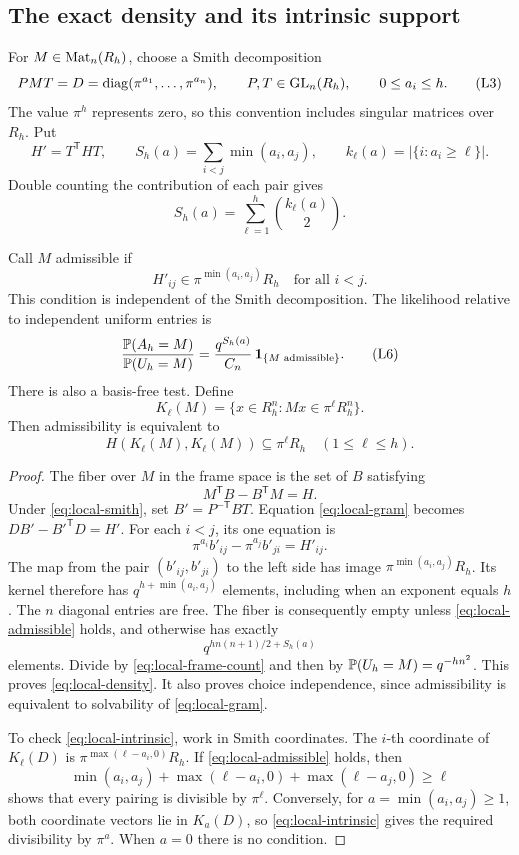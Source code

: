 \subsection{The exact density and its intrinsic support}

For \(M\in\operatorname{Mat}_n(R_h)\), choose a Smith decomposition
\[
 PMT=D=\operatorname{diag}(\pi^{a_1},\ldots,\pi^{a_n}),\qquad
 P,T\in\operatorname{GL}_n(R_h),\qquad 0\le a_i\le h.
 \tag{L3}\label{eq:local-smith}
\]
The value \(\pi^h\) represents zero, so this convention includes singular
matrices over \(R_h\). Put
\[
 H'=T^{\mathsf T}HT,\qquad
 S_h(a)=\sum_{i<j}\min(a_i,a_j),\qquad
 k_\ell(a)=|\{i:a_i\ge\ell\}|.
\]
Double counting the contribution of each pair gives
\[
 S_h(a)=\sum_{\ell=1}^h\binom{k_\ell(a)}2.
 \tag{L4}\label{eq:local-cost}
\]

\begin{theorem}\label{thm:local-density}
Call \(M\) admissible if
\[
 H'_{ij}\in\pi^{\min(a_i,a_j)}R_h\quad\text{for all }i<j.
 \tag{L5}\label{eq:local-admissible}
\]
This condition is independent of the Smith decomposition.
The likelihood relative to independent uniform entries is
\[
 \frac{\mathbb P(A_h=M)}{\mathbb P(U_h=M)}
   =\frac{q^{S_h(a)}}{C_n}\,\mathbf 1_{\{M\text{ admissible}\}}.
 \tag{L6}\label{eq:local-density}
\]
There is also a basis-free test. Define
\[
 K_\ell(M)=\{x\in R_h^n:Mx\in\pi^\ell R_h^n\}.
\]
Then admissibility is equivalent to
\[
 H(K_\ell(M),K_\ell(M))\subseteq\pi^\ell R_h
          \quad(1\le\ell\le h).
 \tag{L7}\label{eq:local-intrinsic}
\]
\end{theorem}

\begin{proof}
The fiber over \(M\) in the frame space is the set of \(B\) satisfying
\[
 M^{\mathsf T}B-B^{\mathsf T}M=H.
 \tag{L8}\label{eq:local-gram}
\]
Under \eqref{eq:local-smith}, set \(B'=P^{-\mathsf T}BT\).
Equation \eqref{eq:local-gram} becomes
\(DB'-B'^{\mathsf T}D=H'\).
For each \(i<j\), its one equation is
\[
 \pi^{a_i}b'_{ij}-\pi^{a_j}b'_{ji}=H'_{ij}.
\]
The map from the pair \((b'_{ij},b'_{ji})\) to the left side has image
\(\pi^{\min(a_i,a_j)}R_h\). Its kernel therefore has
\(q^{h+\min(a_i,a_j)}\) elements, including when an exponent equals \(h\).
The \(n\) diagonal entries are free. The fiber is consequently empty
unless \eqref{eq:local-admissible} holds, and otherwise has exactly
\[
 q^{h n(n+1)/2+S_h(a)}
\]
elements. Divide by \eqref{eq:local-frame-count} and then by
\(\mathbb P(U_h=M)=q^{-hn^2}\). This proves \eqref{eq:local-density}.
It also proves choice independence, since admissibility is equivalent
to solvability of \eqref{eq:local-gram}.

To check \eqref{eq:local-intrinsic}, work in Smith coordinates.
The \(i\)-th coordinate of \(K_\ell(D)\) is
\(\pi^{\max(\ell-a_i,0)}R_h\).
If \eqref{eq:local-admissible} holds, then
\[
 \min(a_i,a_j)+\max(\ell-a_i,0)+\max(\ell-a_j,0)\ge\ell
\]
shows that every pairing is divisible by \(\pi^\ell\).
Conversely, for \(a=\min(a_i,a_j)\ge1\), both coordinate vectors lie
in \(K_a(D)\), so \eqref{eq:local-intrinsic} gives the required
divisibility by \(\pi^a\). When \(a=0\) there is no condition.
\end{proof}

